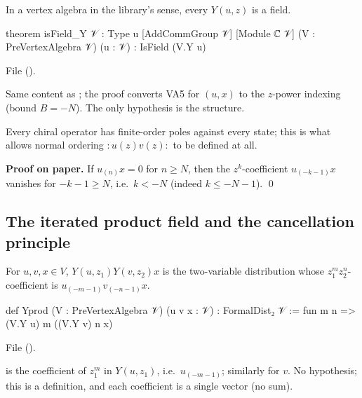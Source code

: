 \begin{theorem}\label{l03:thm:isfield}
In a vertex algebra in the library's sense, every $Y(u,z)$ is a field.
\end{theorem}
\begin{leancode}
theorem isField_Y {𝒱 : Type u} [AddCommGroup 𝒱] [Module ℂ 𝒱] (V : PreVertexAlgebra 𝒱) (u : 𝒱) :
    IsField (V.Y u)
\end{leancode}
File 
().

\begin{dictionary}
Same content as ; the proof converts VA5 for $(u,x)$ to the $z$-power
indexing (bound $B = -N$). The only hypothesis is the structure.
\end{dictionary}

\begin{physics}
Every chiral operator has finite-order poles against every state; this is what allows normal
ordering ${:}u(z)v(z){:}$ to be defined at all.
\end{physics}

\textbf{Proof on paper.} If $u_{(n)}x = 0$ for $n\ge N$, then the $z^k$-coefficient
$u_{(-k-1)}x$ vanishes for $-k-1\ge N$, i.e.\ $k<-N$ (indeed $k\le-N-1$). \qed

\subsection{The iterated product field and the cancellation principle}

\begin{definition}\label{l03:def:yprod}
For $u,v,x\in V$, $Y(u,z_1)Y(v,z_2)x$ is the two-variable distribution whose
$z_1^mz_2^n$-coefficient is $u_{(-m-1)}v_{(-n-1)}x$.
\end{definition}
\begin{leancode}
def Yprod (V : PreVertexAlgebra 𝒱) (u v x : 𝒱) : FormalDist₂ 𝒱 :=
  fun m n => (V.Y u) m ((V.Y v) n x)
\end{leancode}
File  ().

\begin{dictionary}
 is the coefficient of $z_1^m$ in $Y(u,z_1)$, i.e.\ $u_{(-m-1)}$; similarly for
$v$. No hypothesis; this is a definition, and each coefficient is a single vector (no sum).
\end{dictionary}

